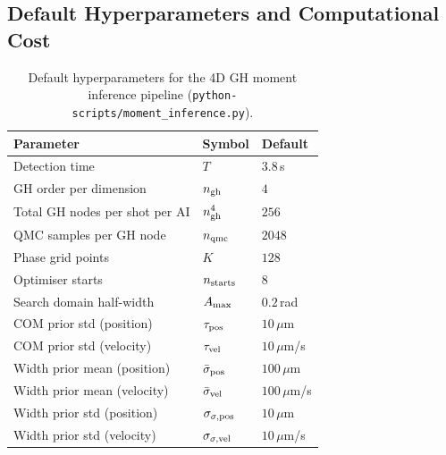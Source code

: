 \documentclass[11pt,a4paper]{article}
\begin{document}
\subsection{Default Hyperparameters and Computational Cost}
\label{sec:gh_cost}

\begin{table}[h]
\centering
\begin{tabular}{lll}
\toprule
Parameter & Symbol & Default \\
\midrule
Detection time                 & $T$ & $3.8$\,s \\
GH order per dimension         & $n_{\rm gh}$ & $4$ \\
Total GH nodes per shot per AI & $n_{\rm gh}^4$ & $256$ \\
QMC samples per GH node        & $n_{\rm qmc}$ & $2048$ \\
Phase grid points              & $K$ & $128$ \\
Optimiser starts               & $n_{\rm starts}$ & $8$ \\
Search domain half-width       & $A_{\rm max}$ & $0.2$\,rad \\
COM prior std (position)       & $\tau_{\rm pos}$ & $10\,\mu$m \\
COM prior std (velocity)       & $\tau_{\rm vel}$ & $10\,\mu$m/s \\
Width prior mean (position)    & $\bar\sigma_{\rm pos}$ & $100\,\mu$m \\
Width prior mean (velocity)    & $\bar\sigma_{\rm vel}$ & $100\,\mu$m/s \\
Width prior std (position)     & $\sigma_{\sigma,{\rm pos}}$ & $10\,\mu$m \\
Width prior std (velocity)     & $\sigma_{\sigma,{\rm vel}}$ & $10\,\mu$m/s \\
\bottomrule
\end{tabular}
\caption{Default hyperparameters for the 4D GH moment inference pipeline
(\texttt{python-scripts/moment\_inference.py}).}
\label{tab:gh_params}
\end{table}
\end{document}
